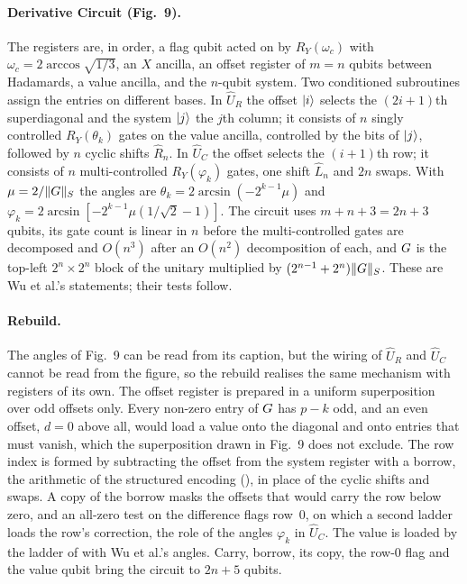 \paragraph{Derivative Circuit (Fig.~9).} The registers are, in order, a flag qubit acted on by $R_Y(\omega_c)$ with $\omega_c = 2\arccos\sqrt{1/3}$, an $X$ ancilla, an offset register of $m = n$ qubits between Hadamards, a value ancilla, and the $n$-qubit system. Two conditioned subroutines assign the entries on different bases. In $\hat U_R$ the offset $\ket{i}$ selects the $(2i+1)$th superdiagonal and the system $\ket{j}$ the $j$th column; it consists of $n$ singly controlled $R_Y(\theta_k)$ gates on the value ancilla, controlled by the bits of $\ket{j}$, followed by $n$ cyclic shifts $\hat R_n$. In $\hat U_C$ the offset selects the $(i+1)$th row; it consists of $n$ multi-controlled $R_Y(\varphi_k)$ gates, one shift $\hat L_n$ and $2n$ swaps. With $\mu = 2/\|G\|_S$ the angles are $\theta_k = 2\arcsin(-2^{k-1}\mu)$ and $\varphi_k = 2\arcsin[-2^{k-1}\mu(1/\sqrt2-1)]$. The circuit uses $m+n+3 = 2n+3$ qubits, its gate count is linear in $n$ before the multi-controlled gates are decomposed and $O(n^3)$ after an $O(n^2)$ decomposition of each, and $G$ is the top-left $2^n\times2^n$ block of the unitary multiplied by $(2^{n-1}+2^n)\|G\|_S$. These are Wu et al.'s statements; their tests follow.

\paragraph{Rebuild.} The angles of Fig.~9 can be read from its caption, but the wiring of $\hat U_R$ and $\hat U_C$ cannot be read from the figure, so the rebuild realises the same mechanism with registers of its own. The offset register is prepared in a uniform superposition over odd offsets only. Every non-zero entry of $G$ has $p-k$ odd, and an even offset, $d=0$ above all, would load a value onto the diagonal and onto entries that must vanish, which the superposition drawn in Fig.~9 does not exclude. The row index is formed by subtracting the offset from the system register with a borrow, the arithmetic of the structured encoding (), in place of the cyclic shifts and swaps. A copy of the borrow masks the offsets that would carry the row below zero, and an all-zero test on the difference flags row~0, on which a second ladder loads the row's correction, the role of the angles $\varphi_k$ in $\hat U_C$. The value is loaded by the ladder of  with Wu et al.'s angles. Carry, borrow, its copy, the row-0 flag and the value qubit bring the circuit to $2n+5$ qubits.

